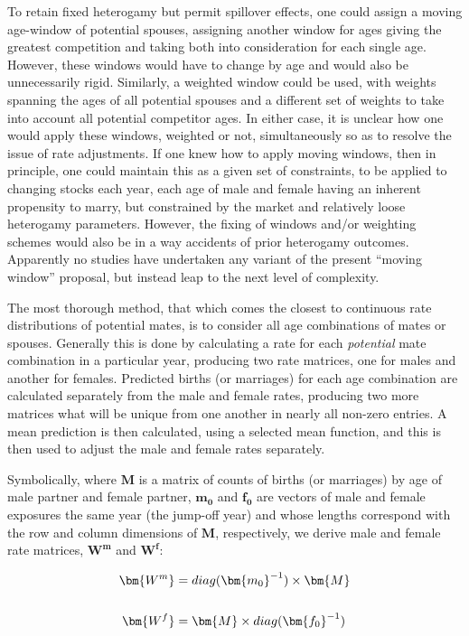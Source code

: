 To retain fixed heterogamy but permit spillover effects, one could assign a moving age-window of potential spouses, assigning another window for ages giving the greatest competition and taking both into consideration for each single age. However, these windows would have to change by age and would also be unnecessarily rigid. Similarly, a weighted window could be used, with weights spanning the ages of all potential spouses and a different set of weights to take into account all potential competitor ages. In either case, it is unclear how one would apply these windows, weighted or not, simultaneously so as to resolve the issue of rate adjustments. If one knew how to apply moving windows, then in principle, one could maintain this as a given set of constraints, to be applied to changing stocks each year, each age of male and female having an inherent propensity to marry, but constrained by the market and relatively loose heterogamy parameters. However, the fixing of windows and/or weighting schemes would also be in a way accidents of prior heterogamy outcomes. Apparently no studies have undertaken any variant of the present ``moving window'' proposal, but instead leap to the next level of complexity.

The most thorough method, that which comes the closest to continuous rate distributions of potential mates, is to consider all age combinations of mates or spouses. Generally this is done by calculating a rate for each \textit{potential} mate combination in a particular year, producing two rate matrices, one for males and another for females. Predicted births (or marriages) for each age combination are calculated separately from the male and female rates, producing two more matrices what will be unique from one another in nearly all non-zero entries. A mean prediction is then calculated, using a selected mean function, and this is then used to adjust the male and female rates separately.

Symbolically, where $\bm{M}$ is a matrix of counts of births (or marriages) by age of male partner and female partner, $\bm{m_0}$ and $\bm{f_0}$ are vectors of male and female exposures the same year (the jump-off year) and whose lengths correspond with the row and column dimensions of $\bm{M}$, respectively, we derive male and female rate matrices, $\bm{W^m}$ and $\bm{W^f}$:

\begin{align}
\bm{W^m} &= diag(\bm{m_0}^{-1}) \times \bm{M} \notag \\ \notag \\
\bm{W^f} &= \bm{M} \times diag(\bm{f_0}^{-1})
\end{align}

